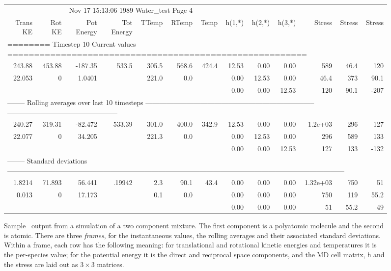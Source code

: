 \begin{figure}
\caption[Sample \moldy\  output.]{Sample \moldy\  output from a simulation 
of a two component mixture.  The first component is a polyatomic
molecule and the second is atomic.  There are three {\em frames}, for
the instantaneous values, the rolling averages and their associated
standard deviations.  Within a frame, each row has the following
meaning: for translational and rotational kinetic energies and
temperatures it is the per-species value; for the potential energy it
is the direct and reciprocal space components, and the MD cell matrix,
{\tt h} and the stress are laid out as $3\times 3$ matrices.}
\label{fig:output}
\tiny
%
\begin{tabular}{rrrrrrrr
@{\hspace{1em}}r@{\hspace{1em}}rr@{\hspace{1em}}r@{\hspace{1em}}r}
\multicolumn{6}{r}{\hfill Nov 17 15:13:06 1989 \hfill Water\_test
\hfill Page 4} & & & & & & &\\
Trans KE & Rot KE & Pot Energy & Tot Energy & TTemp & RTemp & Temp &
h(1,*) & h(2,*) & h(3,*) & Stress & Stress & Stress \\
\multicolumn{13}{l}{======== Timestep 10      Current values
======================================================== } \\
243.88 & 453.88  & -187.35  & 533.5  & 305.5  & 568.6  & 424.4  &
12.53  & 0.00  & 0.00  & 589  & 46.4  & 120 \\
22.053  & 0  & 1.0401 & & 221.0  & 0.0 & & 0.00  & 12.53  & 0.00  & 46.4
& 373  & 90.1 \\
 &  &  &  &  & & &  0.00  & 0.00  & 12.53 & 120  & 90.1  & -207 \\
\multicolumn{13}{l}{-------- Rolling averages over last 10 timesteps
--------------------------------------------------------------------------
------------------------------------------------
} \\
240.27 & 319.31 & -82.472 & 533.39 & 301.0 & 400.0 & 342.9 & 12.53 &
0.00 & 0.00 & 1.2e+03 & 296 & 127 \\
22.077 & 0 & 34.205  & & 221.3 & 0.0 & & 0.00 & 12.53 & 0.00 & 296 &
589 & 133 \\
& & & & & & & 0.00 & 0.00 & 12.53 & 127 & 133 & -132 \\
\multicolumn{13}{l}{-------- Standard deviations
---------------------------------------------------------------------------------------------------------------------------------------------------
} \\
1.8214 & 71.893 & 56.441 &.19942 & 2.3 & 90.1 & 43.4 & 0.00 & 0.00 &
0.00 & 1.32e+03 & 750 & 51 \\
0.013 & 0 & 17.173 & & 0.1 & 0.0 & & 0.00 & 0.00 & 0.00 & 750 & 119 & 55.2 \\
 & & &  &  &  &  & 0.00  & 0.00 & 0.00 & 51 & 55.2 & 49 \\
\end{tabular}
\end{figure}

